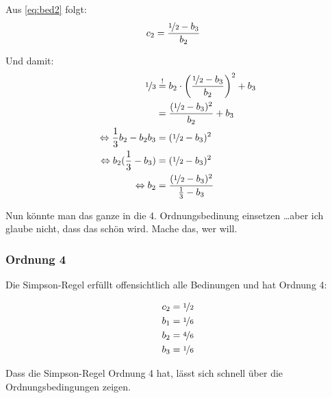 Aus \ref{eq:bed2} folgt:
\begin{align}
    c_2 &= \frac{\nicefrac{1}{2} - b_3}{b_2}
\end{align}

Und damit:
\begin{align}
    \nicefrac{1}{3} &\stackrel{!}{=} b_2 \cdot \left (\frac{\nicefrac{1}{2} - b_3}{b_2} \right )^2 + b_3\\
                &= \frac{(\nicefrac{1}{2} - b_3)^2}{b_2} + b_3\\
\Leftrightarrow \frac{1}{3} b_2 - b_2 b_3&= (\nicefrac{1}{2} - b_3)^2\\
\Leftrightarrow b_2 (\frac{1}{3} - b_3) &= (\nicefrac{1}{2} - b_3)^2\\
\Leftrightarrow b_2  &= \frac{(\nicefrac{1}{2} - b_3)^2}{\frac{1}{3} - b_3}
\end{align}

Nun könnte man das ganze in die 4. Ordnungsbedinung einsetzen \dots aber ich
glaube nicht, dass das schön wird. Mache das, wer will.

\subsubsection*{Ordnung 4}
Die Simpson-Regel erfüllt offensichtlich alle Bedinungen und hat
Ordnung 4:

\begin{align}
    c_2 &= \nicefrac{1}{2}\\
    b_1 &= \nicefrac{1}{6}\\
    b_2 &= \nicefrac{4}{6}\\
    b_3 &= \nicefrac{1}{6}
\end{align}

Dass die Simpson-Regel Ordnung 4 hat, lässt sich schnell über
die Ordnungsbedingungen zeigen.
